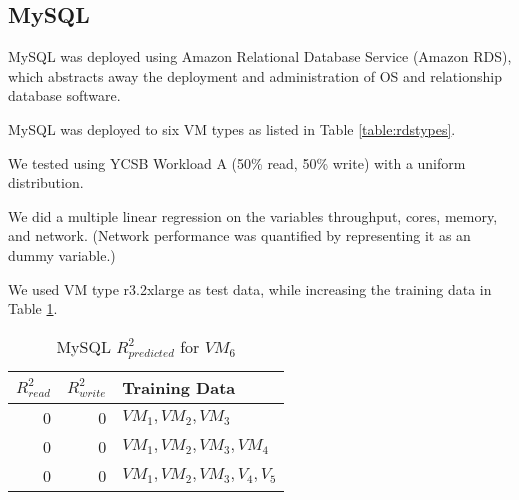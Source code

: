 \documentclass{acm_proc_article-sp}
\begin{document}

\subsection{MySQL}

MySQL was deployed using Amazon Relational Database Service (Amazon RDS), which abstracts away the deployment and administration of OS and relationship database software.

MySQL was deployed to six VM types as listed in Table \ref{table:rdstypes}.

We tested using YCSB Workload A (50\% read, 50\% write) with a uniform distribution.

We did a multiple linear regression on the variables throughput, cores, memory, and network.  (Network performance was quantified by representing it as an dummy variable.)

We used VM type r3.2xlarge as test data, while increasing the training data in Table \ref{table:mysql}.

\begin{table}
\centering
\caption{MySQL $R_{predicted}^2$ for $VM_6$}
\begin{tabular}{|r|r|l|} \hline
$R_{read}^2$&$R_{write}^2$&Training Data\\ \hline
0 & 0& $VM_1,VM_2,VM_3$\\ \hline
0 & 0& $VM_1,VM_2,VM_3,VM_4$\\ \hline
0 & 0& $VM_1,VM_2,VM_3,V_4,V_5$\\ \hline
\hline\end{tabular}
\label{table:mysql}
\end{table}
\end{document}
